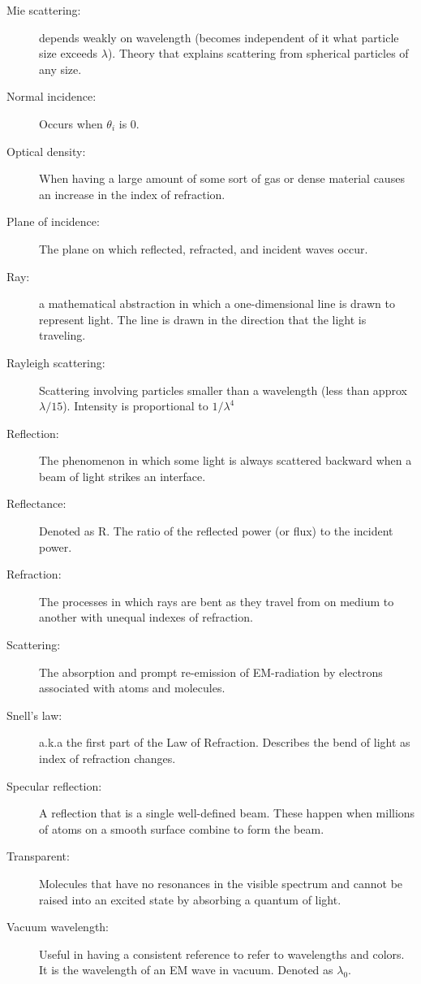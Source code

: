 \documentclass[12pt]{report}
\begin{document}
\begin{description}
\item[Mie scattering: ] depends weakly on wavelength (becomes independent of it what particle size exceeds $\lambda$). Theory that explains scattering from spherical particles of any size. 
\item[Normal incidence: ] Occurs when $\theta_i$ is 0.
\item[Optical density: ] When having a large amount of some sort of gas or dense material causes an increase in the index of refraction.
\item[Plane of incidence: ] The plane on which reflected, refracted, and incident waves occur. 
\item[Ray: ] a mathematical abstraction in which a one-dimensional line is drawn to represent light. The line is drawn in the direction that the light is traveling.
\item[Rayleigh scattering: ] Scattering involving particles smaller than a wavelength (less than approx $\lambda/15$). Intensity is proportional to $1/\lambda^4$
\item[Reflection: ] The phenomenon in which some light is always scattered backward when a beam of light strikes an interface. 
\item[Reflectance: ] Denoted as R. The ratio of the reflected power (or flux) to the incident power. 
\item[Refraction: ] The processes in which rays are bent as they travel from on medium to another with  unequal indexes of refraction. 
\item[Scattering: ] The absorption and prompt re-emission of EM-radiation by electrons associated with atoms and molecules. 
\item[Snell's law: ] a.k.a the first part of the Law of Refraction. Describes the bend of light as index of refraction changes. 
\item[Specular reflection: ] A reflection that is a single well-defined beam. These happen when millions of atoms on a smooth surface combine to form the beam.
\item[Transparent: ] Molecules that have no resonances in the visible spectrum and cannot be raised into an excited state by absorbing a quantum of light. 
\item[Vacuum wavelength: ] Useful in having a consistent reference to refer to wavelengths and colors. It is the wavelength of an EM wave in vacuum. Denoted as $\lambda_0$.
\end{description}
\end{document}
